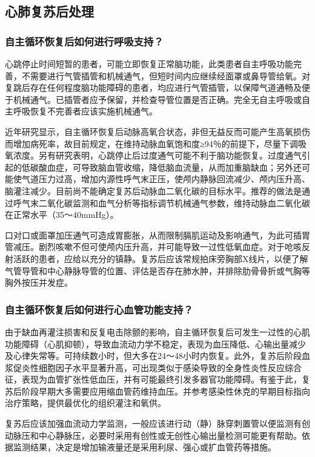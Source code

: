 \subsection{心肺复苏后处理}

\subsubsection{自主循环恢复后如何进行呼吸支持？}

心跳停止时间短暂的患者，可能立即恢复正常脑功能，此类患者自主呼吸功能完善，不需要进行气管插管和机械通气，但短时间内应继续经面罩或鼻导管给氧。对复跳后存在任何程度脑功能障碍的患者，均应进行气管插管，以保障气道通畅及便于机械通气。已插管者应予保留，并检查导管位置是否正确。完全无自主呼吸或自主呼吸恢复不完善者应该实施机械通气。

近年研究显示，自主循环恢复后动脉高氧合状态，非但无益反而可能产生高氧损伤而增加病死率，故目前规定，在维持动脉血氧饱和度≥94％的前提下，尽量下调吸氧浓度。另有研究表明，心跳停止后过度通气可能不利于脑功能恢复。过度通气引起的低碳酸血症，可导致脑血管收缩，降低脑血流量，从而加重脑缺血；另外还可能使气道压力过高，增加内源性呼气末正压，使颅内静脉回流减少、颅内压升高、脑灌注减少。目前尚不能确定复苏后动脉血二氧化碳的目标水平。推荐的做法是通过呼气末二氧化碳监测和血气分析等指标调节机械通气参数，维持动脉血二氧化碳在正常水平（35～40mmHg）。

口对口或面罩加压通气可造成胃膨胀，从而限制膈肌运动及影响通气，为此可插胃管减压。剧烈咳嗽不但可使颅内压升高，并可能导致一过性低氧血症。对于呛咳反射活跃的患者，应给以充分的镇静。复苏后应该常规拍床旁胸部X线片，以便了解气管导管和中心静脉导管的位置、评估是否存在肺水肿，并排除肋骨骨折或气胸等胸外按压并发症。

\subsubsection{自主循环恢复后如何进行心血管功能支持？}

由于缺血再灌注损害和反复电击除颤的影响，自主循环恢复后可发生一过性的心肌功能障碍（心肌抑顿），导致血流动力学不稳定，表现为血压降低、心输出量减少及心律失常等。可持续数小时，但大多在24～48小时内恢复。此外，复苏后阶段血浆促炎性细胞因子水平显著升高，可出现类似于感染导致的全身性炎性反应综合征，表现为血管扩张性低血压，并有可能最终引发多器官功能障碍。有鉴于此，复苏后阶段早期大多需要应用缩血管药维持血压。并参考感染性休克的早期目标指向治疗策略，提供最优化的组织灌注和氧供。

复苏后应该加强血流动力学监测，一般应该进行动（静）脉穿刺置管以便监测有创动脉压和中心静脉压，必要时采用有创性或无创性心输出量检测可能更有帮助。依据监测结果，决定是增加输液量还是采用利尿、强心或扩血管药等措施。

